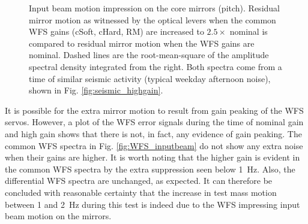 \begin{figure}
\begin{centering}
\caption[Impression of input beam motion on the core mirrors]{Input
  beam motion impression on the core mirrors (pitch). Residual mirror
  motion as witnessed by the optical levers when the common WFS gains
  (cSoft, cHard, RM) are increased to $2.5\times$ nominal is compared
  to residual mirror motion when the WFS gains are nominal. Dashed
  lines are the root-mean-square of the amplitude spectral density
  integrated from the right. Both spectra come from a time of similar
  seismic activity (typical weekday afternoon noise), shown in
  Fig. \ref{fig:seismic_highgain}.}
\label{fig:inputbeam_impression}
\end{centering}
\end{figure}

It is possible for the extra mirror motion to result from gain peaking
of the WFS servos. However, a plot of the WFS error signals during the
time of nominal gain and high gain shows that there is not, in fact,
any evidence of gain peaking. The common WFS spectra in
Fig. \ref{fig:WFS_inputbeam} do not show any extra noise when their
gains are higher. It is worth noting that the higher gain is evident
in the common WFS spectra by the extra suppression seen below
1~Hz. Also, the differential WFS spectra are unchanged, as
expected. It can therefore be concluded with reasonable certainty that
the increase in test mass motion between 1 and 2~Hz during this test
is indeed due to the WFS impressing input beam motion on the mirrors.

